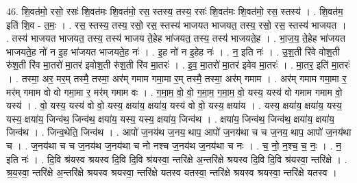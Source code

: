 \documentclass[17pt]{extarticle}
\begin{document}
46. शि॒वत॑मो॒ रसो॒ रसः॑ शि॒वत॑मः शि॒वत॑मो॒ रस॒ स्तस्य॒ तस्य॒ रसः॑ शि॒वत॑मः शि॒वत॑मो॒ रस॒ स्तस्य॑ । . शि॒वत॑म॒ इति॑ शि॒व - त॒मः॒ । . रस॒ स्तस्य॒ तस्य॒ रसो॒ रस॒ स्तस्य॑ भाजयत भाजयत॒ तस्य॒ रसो॒ रस॒ स्तस्य॑ भाजयत । . तस्य॑ भाजयत भाजयत॒ तस्य॒ तस्य॑ भाजय ते॒हेह भा॑जयत॒ तस्य॒ तस्य॑ भाजयते॒ह । . भा॒ज॒य॒ ते॒हेह भा॑जयत भाजयते॒ह नो॑ न इ॒ह भा॑जयत भाजयते॒ह नः॑ । . इ॒ह नो॑ न इ॒हेह नः॑ । . न॒ इति नः॑ । . उ॒श॒ती रि॑वे वोश॒ती रु॑श॒ती रि॑व मा॒तरो॑ मा॒तर॑ इवोश॒ती रु॑श॒ती रि॑व मा॒तरः॑ । . इ॒व॒ मा॒तरो॑ मा॒तर॑ इवेव मा॒तरः॑ । . मा॒तर॒ इति॑ मा॒तरः॑ । . तस्मा॒ अर॒ मर॒म् तस्मै॒ तस्मा॒ अर॑म् गमाम गमा॒मा र॒म् तस्मै॒ तस्मा॒ अर॑म् गमाम । . अर॑म् गमाम गमा॒मा र॒ मर॑म् गमाम वो वो गमा॒मा र॒ मर॑म् गमाम वः । . ग॒मा॒म॒ वो॒ वो॒ ग॒मा॒म॒ ग॒मा॒म॒ वो॒ यस्य॒ यस्य॑ वो गमाम गमाम वो॒ यस्य॑ । . वो॒ यस्य॒ यस्य॑ वो वो॒ यस्य॒ क्षया॑य॒ क्षया॑य॒ यस्य॑ वो वो॒ यस्य॒ क्षया॑य । . यस्य॒ क्षया॑य॒ क्षया॑य॒ यस्य॒ यस्य॒ क्षया॑य॒ जिन्व॑थ॒ जिन्व॑थ॒ क्षया॑य॒ यस्य॒ यस्य॒ क्षया॑य॒ जिन्व॑थ । . क्षया॑य॒ जिन्व॑थ॒ जिन्व॑थ॒ क्षया॑य॒ क्षया॑य॒ जिन्व॑थ । . जिन्व॒थेति॒ जिन्व॑थ । . आपो॑ ज॒नय॑थ ज॒नय॒ थाप॒ आपो॑ ज॒नय॑था च च ज॒नय॒ थाप॒ आपो॑ ज॒नय॑था च । . ज॒नय॑था च च ज॒नय॑थ ज॒नय॑था च नो नश्च ज॒नय॑थ ज॒नय॑था च नः । . च॒ नो॒ न॒श्च॒ च॒ नः॒ । . न॒ इति नः॑ । . दि॒वि श्र॑यस्व श्रयस्व दि॒वि दि॒वि श्र॑यस्वा॒ न्तरि॑क्षे अ॒न्तरि॑क्षे श्रयस्व दि॒वि दि॒वि श्र॑यस्वा॒ न्तरि॑क्षे । . श्र॒य॒स्वा॒ न्तरि॑क्षे अ॒न्तरि॑क्षे श्रयस्व श्रयस्वा॒ न्तरि॑क्षे यतस्व यतस्वा॒ न्तरि॑क्षे श्रयस्व श्रयस्वा॒ न्तरि॑क्षे यतस्व । \newline
\end{document}
